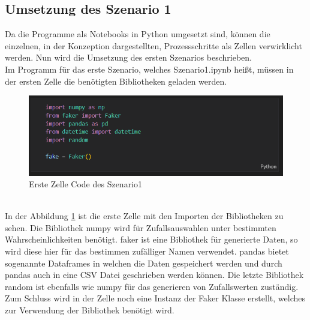 \begin{onehalfspace}
\subsection{Umsetzung des Szenario 1}
\label{umsetzungsz1}
Da die Programme als Notebooks in Python umgesetzt sind, können die einzelnen, in der Konzeption dargestellten, Prozessschritte als Zellen verwirklicht werden. Nun wird die Umsetzung des ersten Szenarios beschrieben.\\
Im Programm für das erste Szenario, welches \glqq{}Szenario1.ipynb\grqq{} heißt, müssen in der ersten Zelle die benötigten Bibliotheken geladen werden.
\begin{figure}[h]
    \centering
    \includegraphics{Diagramme/Sz1_Cell1.PNG}
    \caption{Erste Zelle Code des Szenario1}
    \label{fig:Zelle1S1}
\end{figure}\\
In der Abbildung \ref{fig:Zelle1S1} ist die erste Zelle mit den Importen der Bibliotheken zu sehen. Die Bibliothek \glqq{}numpy\grqq{} wird für Zufallsauswahlen unter bestimmten Wahrscheinlichkeiten benötigt. \glqq{}faker\grqq{} ist eine Bibliothek für generierte Daten, so wird diese hier für das bestimmen zufälliger Namen verwendet. \glqq{}pandas\grqq{} bietet sogenannte Dataframes in welchen die Daten gespeichert werden und durch pandas auch in eine CSV Datei geschrieben werden können. Die letzte Bibliothek \glqq{}random\grqq{} ist ebenfalls wie \glqq{}numpy\grqq{} für das generieren von Zufallswerten zuständig. Zum Schluss wird in der Zelle noch eine Instanz der Faker Klasse erstellt, welches zur Verwendung der Bibliothek benötigt wird.\\

\end{onehalfspace}
